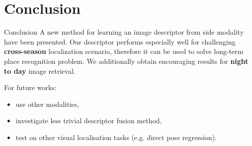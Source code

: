 \section{Conclusion}

\label{sec:conclusion}

\begin{frame}{Conclusion}
	A new method for learning an image descriptor from side modality have been presented. Our descriptor performs especially well for challenging \textbf{cross-season} localization scenario, therefore it can be used to solve long-term place recognition problem. We additionally obtain encouraging results for \textbf{night to day} image retrieval.
	\vfill
	\uncover<2->
	{
	For future works:
	\begin{itemize}
		\item use other modalities,
		\item investigate less trivial descriptor fusion method,
		\item test on other visual localisation tasks (e.g. direct pose regression).
	\end{itemize}
	}
\end{frame}
